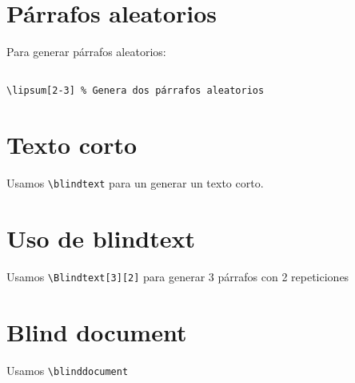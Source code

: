 \documentclass[12pt,
              ]{article}
\begin{document}
\section{Párrafos aleatorios}

Para generar párrafos aleatorios:

\begin{verbatim}

\lipsum[2-3] % Genera dos párrafos aleatorios

\end{verbatim}

\lipsum[2-3] %

\section{Texto corto}

Usamos \verb|\blindtext| para un generar un texto corto.

\blindtext

\section{Uso de blindtext}

Usamos \verb|\Blindtext[3][2]| para generar 3 párrafos con 2 repeticiones
 
\Blindtext[3][2]


\section{Blind document}

Usamos \verb|\blinddocument|

\blinddocument
\end{document}
